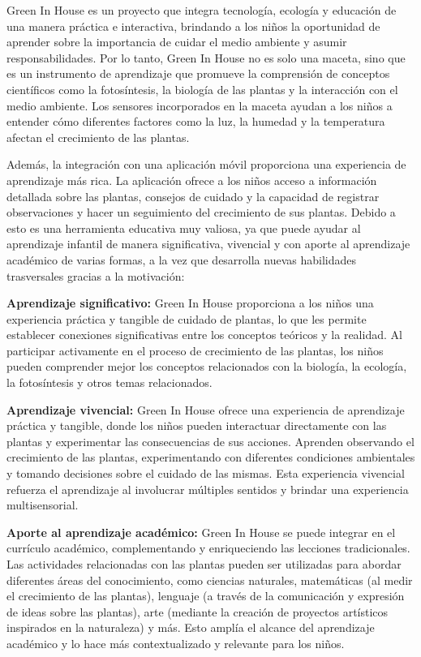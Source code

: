 
Green In House es un proyecto que integra tecnología, ecología y educación de una manera práctica e interactiva, brindando a los niños la oportunidad de aprender sobre la importancia de cuidar el medio ambiente y asumir responsabilidades. Por lo tanto, Green In House no es solo una maceta, sino que es un instrumento de aprendizaje que promueve la comprensión de conceptos científicos como la fotosíntesis, la biología de las plantas y la interacción con el medio ambiente. Los sensores incorporados en la maceta ayudan a los niños a entender cómo diferentes factores como la luz, la humedad y la temperatura afectan el crecimiento de las plantas.

Además, la integración con una aplicación móvil proporciona una experiencia de aprendizaje más rica. La aplicación ofrece a los niños acceso a información detallada sobre las plantas, consejos de cuidado y la capacidad de registrar observaciones y hacer un seguimiento del crecimiento de sus plantas. Debido a esto es una herramienta educativa muy valiosa, ya que puede ayudar al aprendizaje infantil de manera significativa, vivencial y con aporte al aprendizaje académico de varias formas, a la vez que desarrolla nuevas habilidades trasversales gracias a la motivación:

\textbf{Aprendizaje significativo:} Green In House proporciona a los niños una experiencia práctica y tangible de cuidado de plantas, lo que les permite establecer conexiones significativas entre los conceptos teóricos y la realidad. Al participar activamente en el proceso de crecimiento de las plantas, los niños pueden comprender mejor los conceptos relacionados con la biología, la ecología, la fotosíntesis y otros temas relacionados.

\textbf{Aprendizaje vivencial:} Green In House ofrece una experiencia de aprendizaje práctica y tangible, donde los niños pueden interactuar directamente con las plantas y experimentar las consecuencias de sus acciones. Aprenden observando el crecimiento de las plantas, experimentando con diferentes condiciones ambientales y tomando decisiones sobre el cuidado de las mismas. Esta experiencia vivencial refuerza el aprendizaje al involucrar múltiples sentidos y brindar una experiencia multisensorial.

\textbf{Aporte al aprendizaje académico:} Green In House se puede integrar en el currículo académico, complementando y enriqueciendo las lecciones tradicionales. Las actividades relacionadas con las plantas pueden ser utilizadas para abordar diferentes áreas del conocimiento, como ciencias naturales, matemáticas (al medir el crecimiento de las plantas), lenguaje (a través de la comunicación y expresión de ideas sobre las plantas), arte (mediante la creación de proyectos artísticos inspirados en la naturaleza) y más. Esto amplía el alcance del aprendizaje académico y lo hace más contextualizado y relevante para los niños.

